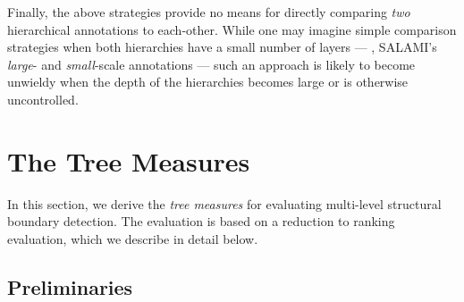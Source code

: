 \documentclass{article}
\begin{document}
Finally, the above strategies provide no means for directly comparing \emph{two} hierarchical annotations
to each-other.  While one may imagine simple comparison strategies when both hierarchies have a small
number of layers --- \eg, SALAMI's \emph{large}- and \emph{small}-scale annotations --- such an approach is
likely to become unwieldy when the depth of the hierarchies becomes large or is otherwise uncontrolled.



\section{The Tree Measures}\label{sec:eval_desc}
\sloppy
In this section, we derive the \emph{tree measures} for evaluating multi-level structural boundary detection.
The evaluation is based on a reduction to ranking evaluation, which we describe in detail below.

\subsection{Preliminaries}

\end{document}
